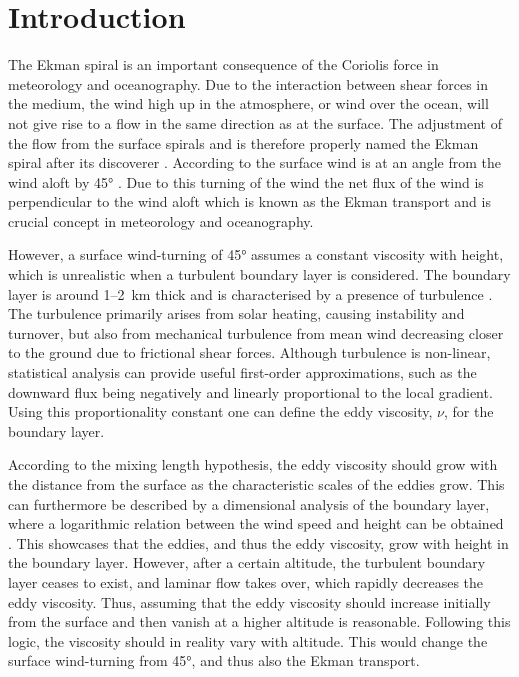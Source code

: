 \section{Introduction}
The Ekman spiral is an important consequence of the Coriolis force in meteorology and oceanography. Due to the interaction between shear forces in the medium, the wind high up in the atmosphere, or wind over the ocean, will not give rise to a flow in the same direction as at the surface. The adjustment of the flow from the surface spirals and is therefore properly named the Ekman spiral after its discoverer \citet{ekman1905}. According to \citet{ekman1905} the surface wind is at an angle from the wind aloft by \ang{45} \citep{ekman1905}. Due to this turning of the wind the net flux of the wind is perpendicular to the wind aloft which is known as the Ekman transport and is crucial concept in meteorology and oceanography.

However, a surface wind-turning of \ang{45} assumes a constant viscosity with height, which is unrealistic when a turbulent boundary layer is considered. The boundary layer is around \SI{1}{}--\SI{2}{\kilo\meter} thick and is characterised by a presence of turbulence \citep{wallace2006}. The turbulence primarily arises from solar heating, causing instability and turnover, but also from mechanical turbulence from mean wind decreasing closer to the ground due to frictional shear forces. Although turbulence is non-linear, statistical analysis can provide useful first-order approximations, such as the downward flux being negatively and linearly proportional to the local gradient. Using this proportionality constant one can define the eddy viscosity, $\nu$, for the boundary layer.

According to the mixing length hypothesis, the eddy viscosity should grow with the distance from the surface as the characteristic scales of the eddies grow. This can furthermore be described by a dimensional analysis of the boundary layer, where a logarithmic relation between the wind speed and height can be obtained \citep{wallace2006}. This showcases that the eddies, and thus the eddy viscosity, grow with height in the boundary layer. However, after a certain altitude, the turbulent boundary layer ceases to exist, and laminar flow takes over, which rapidly decreases the eddy viscosity. Thus, assuming that the eddy viscosity should increase initially from the surface and then vanish at a higher altitude is reasonable. Following this logic, the viscosity should in reality vary with altitude. This would change the surface wind-turning from \ang{45}, and thus also the Ekman transport. 

